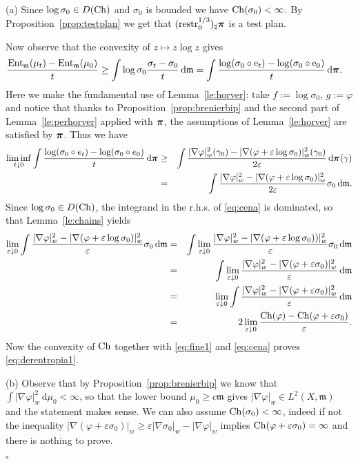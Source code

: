 \documentclass[reqno,11pt]{article}
\numberwithin{equation}{section}
\newcommand{\C}{\mathbb{C}}
\newcommand{\mm}{{\mbox{\boldmath$m$}}}
\newcommand{\ppi}{{\mbox{\boldmath$\pi$}}}
\renewcommand{\d}{{\mathrm d}}
\newcommand{\eps}{\varepsilon}
\newenvironment{proof}{\removelastskip\par\medskip   %
\noindent{\em Proof.}
\rm}{\penalty-20\null\hfill$\square$\par\medbreak}
\newcommand{\ent}[1]{{\rm Ent}_{\mm}(#1)}              %
\newcommand{\e}{{\rm{e}}}                           %
\newcommand{\weakgrad}[1]{|\nabla #1|_w}                %
\renewcommand{\C}{{\rm Ch}}
\renewcommand{\mm}{\mathfrak m}
\begin{document}
\begin{proof} (a) Since $\log\sigma_0\in D(\C)$ and $\sigma_0$ is
bounded we have $\C(\sigma_0)<\infty$. By
Proposition~\ref{prop:testplan} we get that $({\rm
restr}_0^{1/3})_\sharp\ppi$ is a test plan.

Now observe that the convexity of $z\mapsto z\log z$ gives
\begin{equation}
\label{eq:fine1}
\begin{split}
\frac{\ent{\mu_t}-\ent{\mu_0}}t&\geq \int\log\sigma_0
\frac{\sigma_t-\sigma_0}t\,\d\mm=\int\frac{\log(\sigma_0\circ
\e_t)-\log(\sigma_0\circ \e_0)}t \,\d\ppi.
\end{split}
\end{equation}
Here we make the fundamental use of Lemma~\ref{le:horver}: take
$f:=\log\sigma_0$, $g:=\varphi$ and notice that thanks to
Proposition~\ref{prop:brenierbip} and the second part of
Lemma~\ref{le:perhorver} applied with $\ppi$, the assumptions of
Lemma~\ref{le:horver} are satisfied by $\ppi$. Thus we have
\begin{eqnarray}
\label{eq:cena} \liminf_{t\downarrow0}\int\frac{\log(\sigma_0\circ
e_t)-\log(\sigma_0\circ e_0)}t \,\d\ppi
&\geq&\int\frac{\weakgrad{\varphi}^2(\gamma_0)-\weakgrad{(\varphi+\eps\log\sigma_0)}^2(\gamma_0)}{2\eps}\,
\d\ppi(\gamma)\nonumber\\
&=&\int\frac{\weakgrad{\varphi}^2-\weakgrad{(\varphi+\eps\log\sigma_0)}^2}{2\eps}\sigma_0\,\d\mm.
\end{eqnarray}
Since $\log\sigma_0\in D(\C)$, the integrand in the r.h.s. of
\eqref{eq:cena} is dominated, so that Lemma~\ref{le:chains} yields
\begin{eqnarray*}
\lim_{\eps\downarrow0}\int\frac{\weakgrad{\varphi}^2-\weakgrad{(\varphi+\eps\log\sigma_0)}^2}
{\eps}\sigma_0\,\d\mm
&=&\int\lim_{\eps\downarrow0}\frac{\weakgrad{\varphi}^2-\weakgrad{(\varphi+\eps\log\sigma_0))}^2}{\eps}
\sigma_0\,\d\mm\\
&=&\int\lim_{\eps\downarrow0}\frac{\weakgrad{\varphi}^2-\weakgrad{(\varphi+\eps\sigma_0)}^2}{\eps}\,\d\mm\\
&=&\lim_{\eps\downarrow0}\int\frac{\weakgrad{\varphi}^2-\weakgrad{(\varphi+\eps\sigma_0)}^2}{\eps}\,\d\mm\\
&=&2\lim_{\eps\downarrow0}\frac{\C(\varphi)-\C(\varphi+\eps\sigma_0)}{\eps}.
\end{eqnarray*}
Now the convexity of $\C$ together with \eqref{eq:fine1} and
\eqref{eq:cena} proves \eqref{eq:derentropia1}.

\noindent (b) Observe that by Proposition~\ref{prop:brenierbip} we
know that $\int\weakgrad\varphi^2\,\d\mu_0<\infty$, so that the
lower bound $\mu_0\geq c\mm$ gives $\weakgrad\varphi\in L^2(X,\mm)$
and the statement makes sense. We can also assume
$\C(\sigma_0)<\infty$, indeed if not the inequality
$\weakgrad{(\varphi+\eps\sigma_0)}\geq\eps\weakgrad{\sigma_0}-\weakgrad\varphi$
implies $\C(\varphi+\eps\sigma_0)=\infty$ and there is nothing to
prove.


\end{proof}
\end{document}
